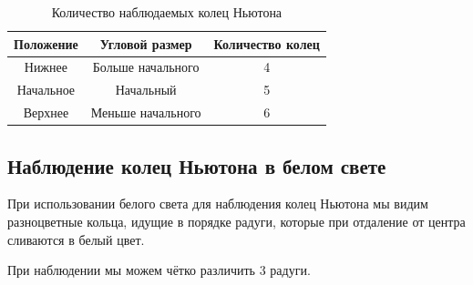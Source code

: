 \begin{table}[H]
	\centering
	\caption{Количество наблюдаемых колец Ньютона}
	\begin{tabular}{ccc}
		\toprule
		Положение & Угловой размер & Количество колец \\
		\midrule
		Нижнее & Больше начального & 4  \\
		Начальное & Начальный & 5 \\
		Верхнее & Меньше начального & 6 \\
		\bottomrule
	\end{tabular}
\end{table}

\subsection{Наблюдение колец Ньютона в белом свете}
При использовании белого света для наблюдения колец Ньютона мы видим разноцветные кольца, идущие в порядке радуги, которые при отдаление от центра сливаются в белый цвет. 

При наблюдении мы можем чётко различить 3 радуги. 